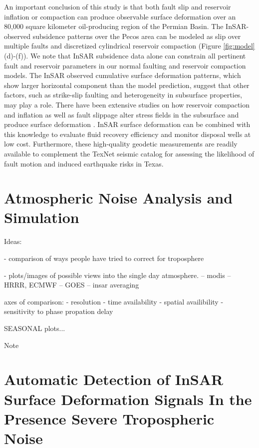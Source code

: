 \documentclass{utexasthesis}
\begin{document}
An important conclusion of this study is that both fault slip and reservoir inflation or compaction can produce observable surface deformation over an 80,000 square kilometer oil-producing region of the Permian Basin. The InSAR-observed subsidence patterns over the Pecos area can be modeled as slip over multiple faults and discretized cylindrical reservoir compaction (Figure \ref{fig:model} (d)-(f)). We note that InSAR subsidence data alone can constrain all pertinent fault and reservoir parameters in our normal faulting and reservoir compaction models. The InSAR observed cumulative surface deformation patterns, which show larger horizontal component than the model prediction, suggest that other factors, such as strike-slip faulting and heterogeneity in subsurface properties, may play a role. There have been extensive studies on how reservoir compaction and inflation as well as fault slippage alter stress fields in the subsurface and produce surface deformation \cite{Geertsma1973, Segall1992, Okada1992, Du1992,Vasco2005, Vasco2008, Khakim2012}. InSAR surface deformation can be combined with this knowledge to evaluate fluid recovery efficiency and monitor disposal wells at low cost. Furthermore, these high-quality geodetic measurements are readily available to complement the TexNet seismic catalog for assessing the likelihood of fault motion and induced earthquake risks in Texas.






\chapter{Atmospheric Noise Analysis and Simulation}
\label{chap:atmo-noise}



Ideas:

- comparison of ways people have tried to correct for troposphere

- plots/images of possible views into the single day atmosphere.
 -- modis
 -- HRRR, ECMWF
 --  GOES
 -- insar averaging
 
 axes of comparison:
 - resolution
 - time availability
 - spatial availibility
 - sensitivity to phase propation delay
 
 
 SEASONAL plots...
 
 Note


\chapter{Automatic Detection of InSAR Surface Deformation Signals In the Presence Severe Tropospheric Noise}
\end{document}
